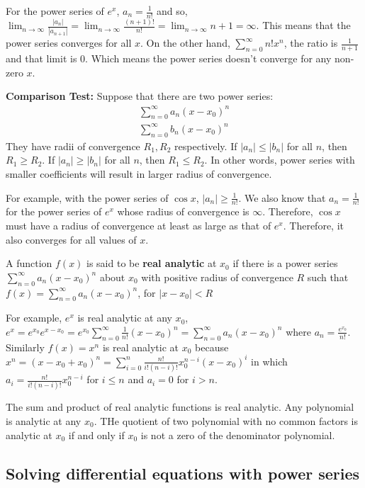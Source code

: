 \documentclass[12pt]{article}
\begin{document}
For the power series of $e^x$, $a_n = \frac{1}{n!}$ and so, $\lim_{n \to \infty} \frac{|a_n|}{|a_{n + 1}|} = \lim_{n \to \infty}  \frac{(n + 1)!}{n!} = \lim_{n \to \infty}  n + 1 = \infty$. This means that the power series converges for all $x$. On the other hand, $\sum_{n = 0}^{\infty} n!x^n$, the ratio is $\frac{1}{n + 1}$ and that limit is $0$. Which means the power series doesn't converge for any non-zero $x$.

\textbf{Comparison Test:} Suppose that there are two power series:
\begin{align*}
    \sum_{n = 0}^{\infty} a_n(x - x_0)^{n} \\
    \sum_{n = 0}^{\infty} b_n(x - x_0)^{n}
\end{align*}
They have radii of convergence $R_1, R_2$ respectively. If $|a_n| \leq |b_n|$ for all $n$, then $R_1 \geq R_2$. If $|a_n| \geq |b_n|$ for all $n$, then $R_1 \leq R_2$. In other words, power series with smaller coefficients will result in larger radius of convergence.

For example, with the power series of $\cos x$, $|a_n| \geq \frac{1}{n!}$. We also know that $a_n = \frac{1}{n!}$ for the power series of $e^x$ whose radius of convergence is $\infty$. Therefore, $\cos x$ must have a radius of convergence at least as large as that of $e^x$. Therefore, it also converges for all values of $x$.

A function $f(x)$ is said to be \textbf{real analytic} at $x_0$ if there is a power series $\sum_{n = 0}^{\infty} a_n(x - x_0)^{n}$ about $x_0$ with positive radius of convergence $R$ such that
$f(x) = \sum_{n = 0}^{\infty} a_n(x - x_0)^{n}$, for $|x - x_0| < R$


For example, $e^x$ is real analytic at any $x_0$, $e^x = e^{x_0}e^{x - x_0} =e^{x_0} \sum_{n = 0}^{\infty} \frac{1}{n!}(x - x_0)^n = \sum_{n = 0}^{\infty} a_n(x - x_0)^{n}$ where $a_n = \frac{e^{x_0}}{n!}$. Similarly $f(x) = x^n$ is real analytic at $x_0$ because $x^n = (x - x_0 + x_0)^n = \sum_{i = 0}^n \frac{n!}{i!(n - i)!}x_0^{n - i}(x - x_0)^i$ in which $a_i = \frac{n!}{i!(n - i)!}x_0^{n - i}$ for $i \leq n$ and $a_i = 0$ for $i > n$. 

The sum and product of real analytic functions is real analytic. Any polynomial is analytic at any $x_0$. THe quotient of two polynomial with no common factors is analytic at $x_0$ if and only if $x_0$ is not a zero of the denominator polynomial. 

\subsection{Solving differential equations with power series}
\end{document}
